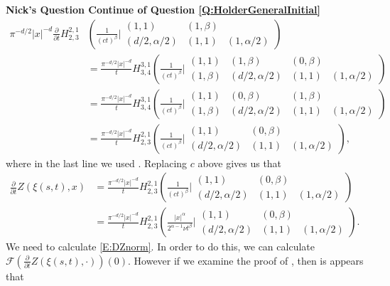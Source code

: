 \documentclass[a4paper,11pt]{article}
\numberwithin{equation}{section}
\theoremstyle{plain}
\theoremstyle{definition}
\newcounter{NQ}
\newenvironment{NickQuestion}[1][] %
{\refstepcounter{NQ}
	\begin{mdframed}[backgroundcolor=lightgray]\textbf{Nick's Question \theNQ \: #1~~}~~~\noindent}%
	{\end{mdframed}}
\numberwithin{NQ}{section}
\numberwithin{LQ}{section}
\numberwithin{ZQ}{section}
\begin{document}
\begin{NickQuestion}[Continue of Question \ref{Q:HolderGeneralInitial}]
\begin{align*}
	\pi^{-d/2} |x|^{-d} \frac{\partial}{\partial t}  H_{2,3}^{2,1} & \left( \frac{1}{(ct)^\beta} \bigg\vert \begin{matrix} (1,1) & (1,\beta) &
		\\ (d/2,\alpha/2) & (1,1) & (1,\alpha/2) \end{matrix} \right) \\  
		&= \frac{\pi^{-d/2}|x|^{-d} }{t}  H_{3,4}^{3,1}\left( \frac{1}{(ct)^\beta} \bigg\vert \begin{matrix} (1,1) & (1,\beta) & (0, \beta) &
			\\(1,\beta) & (d/2,\alpha/2) & (1,1) & (1,\alpha/2) \end{matrix} \right) \\
		&= \frac{\pi^{-d/2}|x|^{-d} }{t}  H_{3,4}^{3,1}\left( \frac{1}{(ct)^\beta} \bigg\vert \begin{matrix} (1,1) & (0, \beta) & (1,\beta) &
			\\(1,\beta) & (d/2,\alpha/2) & (1,1) & (1,\alpha/2) \end{matrix} \right) \\
		& = \frac{\pi^{-d/2}|x|^{-d} }{t}  H_{2,3}^{2,1}\left( \frac{1}{(ct)^\beta} \bigg\vert \begin{matrix} (1,1) & (0, \beta) &
		\\ (d/2,\alpha/2) & (1,1) & (1,\alpha/2) \end{matrix} \right),
	\end{align*}
where in the last line we used \cite[(2.1.2)]{Kilbas}. Replacing $c$ above gives us that 
	\begin{align*}
		\frac{\partial}{\partial t} Z(\xi(s,t),x) &= \frac{\pi^{-d/2}|x|^{-d} }{t}  H_{2,3}^{2,1}\left( \frac{1}{(ct)^\beta} \bigg\vert \begin{matrix} (1,1) & (0, \beta) &
		\\ (d/2,\alpha/2) & (1,1) & (1,\alpha/2) \end{matrix} \right) \\ 
		& = \frac{\pi^{-d/2}|x|^{-d} }{t}  H_{2,3}^{2,1}\left( \frac{|x|^{\alpha}}{2^{\alpha -1} \nu t^\beta} \bigg\vert \begin{matrix} (1,1) & (0, \beta) &
		\\ (d/2,\alpha/2) & (1,1) & (1,\alpha/2) \end{matrix} \right).
	\end{align*}
We need to calculate \eqref{E:DZnorm}. In order to do this, we can calculate $\mathcal{F} \left( \frac{\partial}{\partial t} Z(\xi(s,t),\cdot) \right)(0)$. However if we examine the proof of \cite[Lemma 4.2]{CHHH16}, then is appears that 

\end{NickQuestion}
\end{document}
